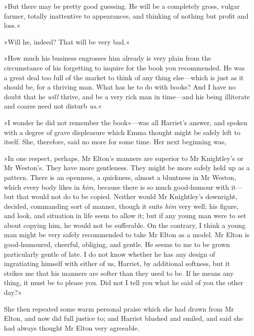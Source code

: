 »But there may be pretty good guessing. He will be a completely gross, vulgar farmer, totally inattentive to appearances, and thinking of nothing but profit and loss.«

»Will he, indeed? That will be very bad.«

»How much his business engrosses him already is very plain from the circumstance of his forgetting to inquire for the book you recommended. He was a great deal too full of the market to think of any thing else—which is just as it should be, for a thriving man. What has he to do with books? And I have no doubt that he \textit{will} thrive, and be a very rich man in time—and his being illiterate and coarse need not disturb \textit{us}.«

»I wonder he did not remember the book«—was all Harriet's answer, and spoken with a degree of grave displeasure which Emma thought might be safely left to itself. She, therefore, said no more for some time. Her next beginning was,

»In one respect, perhaps, Mr Elton's manners are superior to Mr Knightley's or Mr Weston's. They have more gentleness. They might be more safely held up as a pattern. There is an openness, a quickness, almost a bluntness in Mr Weston, which every body likes in \textit{him}, because there is so much good-humour with it—but that would not do to be copied. Neither would Mr Knightley's downright, decided, commanding sort of manner, though it suits \textit{him} very well; his figure, and look, and situation in life seem to allow it; but if any young man were to set about copying him, he would not be sufferable. On the contrary, I think a young man might be very safely recommended to take Mr Elton as a model. Mr Elton is good-humoured, cheerful, obliging, and gentle. He seems to me to be grown particularly gentle of late. I do not know whether he has any design of ingratiating himself with either of us, Harriet, by additional softness, but it strikes me that his manners are softer than they used to be. If he means any thing, it must be to please you. Did not I tell you what he said of you the other day?«

She then repeated some warm personal praise which she had drawn from Mr Elton, and now did full justice to; and Harriet blushed and smiled, and said she had always thought Mr Elton very agreeable.

